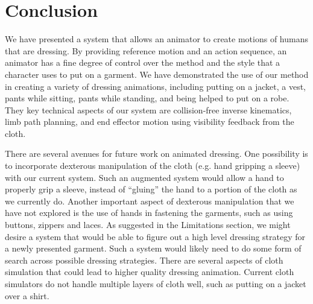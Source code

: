 \section{Conclusion}

We have presented a system that allows an animator to create motions
of humans that are dressing.  By providing reference motion and an
action sequence, an animator has a fine degree of control over the
method and the style that a character uses to put on a garment.  We
have demonstrated the use of our method in creating a variety of
dressing animations, including putting on a jacket, a vest, pants
while sitting, pants while standing, and being helped to put on a
robe.  They key technical aspects of our system are collision-free
inverse kinematics, limb path planning, and end effector motion
using visibility feedback from the cloth.

There are several avenues for future work on animated dressing.  One
possibility is to incorporate dexterous manipulation of the cloth
(e.g. hand gripping a sleeve) with our current system.  Such an
augmented system would allow a hand to properly grip a sleeve, instead
of ``gluing'' the hand to a portion of the cloth as we currently do.
Another important aspect of dexterous manipulation that we have not
explored is the use of hands in fastening the garments, such as using
buttons, zippers and laces.  As suggested in the Limitations section,
we might desire a system that would be able to figure out a high
level dressing strategy for a newly presented garment.  Such a system
would likely need to do some form of search across possible dressing
strategies.  There are several aspects of cloth simulation that could
lead to higher quality dressing animation.  Current cloth simulators
do not handle multiple layers of cloth well, such as putting on a
jacket over a shirt.


